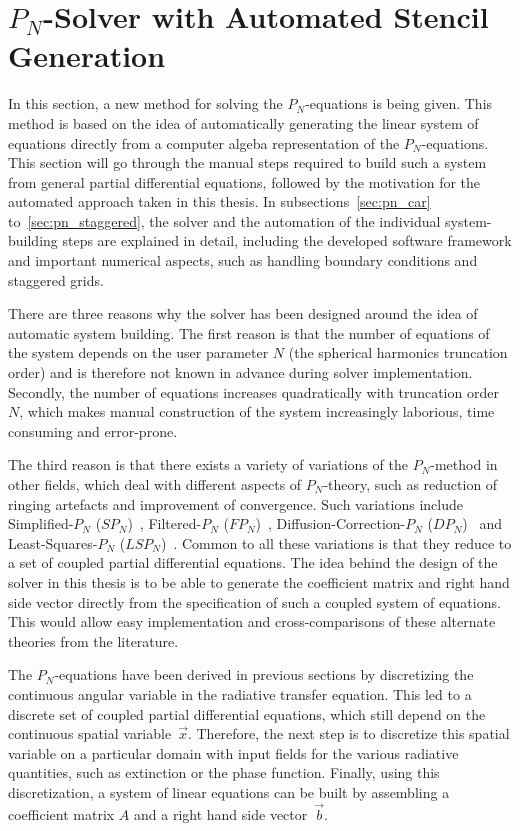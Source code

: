 \section{$P_N$-Solver with Automated Stencil Generation}
\label{sec:pn_solver}

In this section, a new method for solving the $P_N$-equations is being given. This method is based on the idea of automatically generating the linear system of equations directly from a computer algeba representation of the $P_N$-equations. This section will go through the manual steps required to build such a system from general partial differential equations, followed by the motivation for the automated approach taken in this thesis. In subsections~\ref{sec:pn_car} to~\ref{sec:pn_staggered}, the solver and the automation of the individual system-building steps are explained in detail, including the developed software framework and important numerical aspects, such as handling boundary conditions and staggered grids.

There are three reasons why the solver has been designed around the idea of automatic system building. The first reason is that the number of equations of the system depends on the user parameter $N$ (the spherical harmonics truncation order) and is therefore not known in advance during solver implementation. Secondly, the number of equations increases quadratically with truncation order $N$, which makes manual construction of the system increasingly laborious, time consuming and error-prone.

The third reason is that there exists a variety of variations of the $P_N$-method in other fields, which deal with different aspects of $P_N$-theory, such as reduction of ringing artefacts and improvement of convergence. Such variations include Simplified-$P_N$ ($SP_N$)~\cite{Ryan10}, Filtered-$P_N$ ($FP_N$)~\cite{Radice13}, Diffusion-Correction-$P_N$ ($DP_N$)~\cite{Schaefer11} and Least-Squares-$P_N$ ($LSP_N$)~\cite{Hansen14}. Common to all these variations is that they reduce to a set of coupled partial differential equations. The idea behind the design of the solver in this thesis is to be able to generate the coefficient matrix and right hand side vector directly from the specification of such a coupled system of equations. This would allow easy implementation and cross-comparisons of these alternate theories from the literature.

The $P_N$-equations have been derived in previous sections by discretizing the continuous angular variable in the radiative transfer equation. This led to a discrete set of coupled partial differential equations, which still depend on the continuous spatial variable~$\vec{x}$. Therefore, the next step is to discretize this spatial variable on a particular domain with input fields for the various radiative quantities, such as extinction or the phase function. Finally, using this discretization, a system of linear equations can be built by assembling a coefficient matrix $A$ and a right hand side vector~$\vec{b}$.

